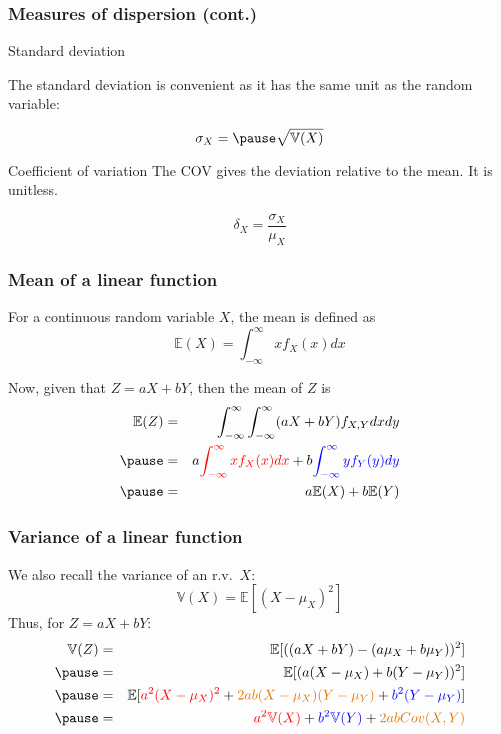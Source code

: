 \documentclass[usenames,dvipsnames,smaller%
]{beamer}
\newcommand{\?}{\stackrel{?}{=}}
\newcommand{\rd}{\color{red}}
\newcommand{\bl}{\color{blue}}
\newcommand{\og}{\color{orange!90!black}}
\begin{document}
\begin{frame}
  \frametitle{Measures of dispersion (cont.)}
  \pause

  \begin{block}{Standard deviation}
    \pause

    The standard deviation is convenient as it has the same unit as the random variable:\pause

    \begin{equation}
      \label{eq:4}
      \sigma_X = \pause \sqrt{\mathbb{V}(X)}
    \end{equation}
  \end{block}
  
  \pause

  \begin{block}{Coefficient of variation}
    The COV gives the deviation relative to the mean. It is unitless.\pause

    \begin{equation}
      \label{eq:5}
      \delta_X = \frac{\sigma_X}{\mu_X}
    \end{equation}
  \end{block}
  
\end{frame}


\begin{frame}
  \frametitle{Mean of a linear function}\pause
  For a continuous random variable $X$, the mean is defined as\pause
  \begin{equation}
    \label{eq:30}
    \mathbb{E}(X) = \int_{-\infty}^\infty xf_X(x) dx
  \end{equation}
  \pause
  
  Now, given that $Z = aX + bY$, then the mean of $Z$ is\pause
  \begin{eqnarray*}
    \mathbb{E}(Z) &=& \int_{-\infty}^\infty\int_{-\infty}^\infty (aX + bY)f_{X,Y}dxdy \\\pause
         &=& a {\rd \int_{-\infty}^\infty x f_X(x)dx } +  b {\bl \int_{-\infty}^\infty y f_Y(y)dy }\\\pause
         &=& a\mathbb{E}(X) + b\mathbb{E}(Y)
  \end{eqnarray*}
\end{frame}

\begin{frame}
  \frametitle{Variance of a linear function}
  \pause
  We also recall the variance of an r.v.\ $X$:
  \begin{equation}
    \label{eq:31}
    \mathbb{V}(X) = \mathbb{E}[(X - \mu_X)^2]
  \end{equation}
  \pause
  Thus, for $Z = aX + bY$:\pause
  \begin{eqnarray*}
    \mathbb{V}(Z) &=& \mathbb{E}[((aX + bY) - (a\mu_X + b\mu_Y))^2] \\\pause
           &=& \mathbb{E}[(a(X - \mu_X) + b(Y - \mu_Y))^2] \\\pause
           &=& \mathbb{E}[{\rd a^2(X - \mu_X)^2} + {\og  2ab(X - \mu_X)(Y - \mu_Y) } + {\bl b^2(Y - \mu_Y)} ]\\\pause
           &=& {\rd a^2\mathbb{V}(X)} + {\bl b^2\mathbb{V}(Y) } + {\og 2ab Cov(X,Y)}
  \end{eqnarray*}
\end{frame}
\end{document}
